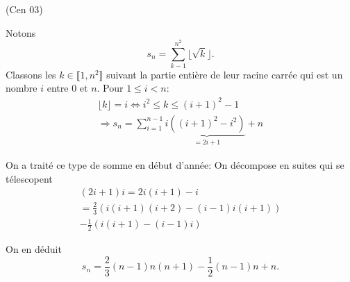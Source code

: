 \begin{tiny}(Cen 03)\end{tiny} Notons
\[
  s_n = \sum_{k - 1}^{n^2} \lfloor \sqrt{k} \rfloor.
\]
Classons les $k\in \llbracket 1, n^2 \rrbracket$ suivant la partie entière de leur racine carrée qui est un nombre $i$ entre $0$ et $n$.\newline
Pour $1 \leq i < n$:
\begin{multline*}
  \lfloor k \rfloor = i \Leftrightarrow i^2 \leq k \leq (i+1)^2 - 1 \\
  \Rightarrow
  s_n = 
  \sum_{i = 1}^{n-1}i \underset{=2i + 1}{\underbrace{\left((i+1)^2 - i^2\right)}} + n
\end{multline*}

On a traité ce type de somme en début d'année:
On décompose en suites qui se télescopent
\begin{multline*}
  (2i+1)i 
  = 2i(i+1) - i\\
  =\frac{2}{3}\left( i(i+1)(i+2) -(i-1)i(i+1)\right) \\ 
  -\frac{1}{2}\left(i(i+1) - (i-1)i\right)
\end{multline*}

On en déduit
\[
  s_n
  = \frac{2}{3}(n-1)n(n+1) -\frac{1}{2}(n-1)n + n.
\]
